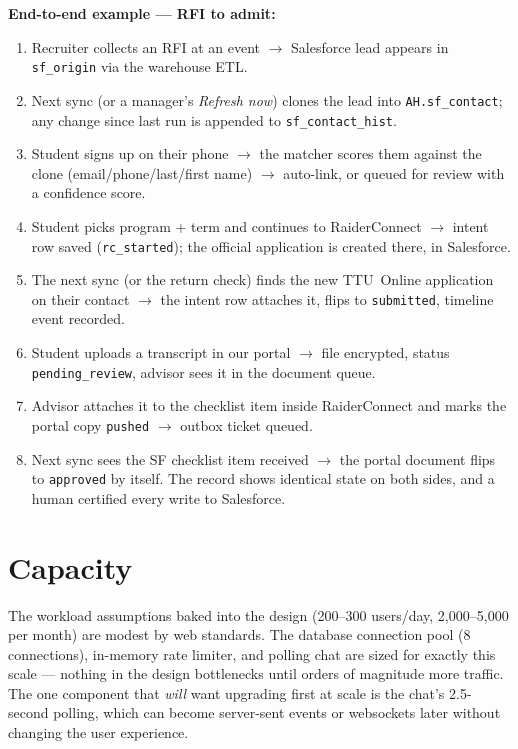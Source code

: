 \documentclass[11pt,letterpaper]{report}
\begin{document}
\begin{plainbox}
\textbf{End-to-end example --- RFI to admit:}
\begin{enumerate}[leftmargin=1.4em,itemsep=2pt]
  \item Recruiter collects an RFI at an event $\rightarrow$ Salesforce lead
        appears in \texttt{sf\_origin} via the warehouse ETL.
  \item Next sync (or a manager's \emph{Refresh now}) clones the lead into
        \texttt{AH.sf\_contact}; any change since last run is appended to
        \texttt{sf\_contact\_hist}.
  \item Student signs up on their phone $\rightarrow$ the matcher scores them
        against the clone (email/phone/last/first name) $\rightarrow$ auto-link,
        or queued for review with a confidence score.
  \item Student picks program + term and continues to RaiderConnect
        $\rightarrow$ intent row saved (\texttt{rc\_started}); the official
        application is created there, in Salesforce.
  \item The next sync (or the return check) finds the new TTU~Online
        application on their contact $\rightarrow$ the intent row attaches it,
        flips to \texttt{submitted}, timeline event recorded.
  \item Student uploads a transcript in our portal $\rightarrow$ file encrypted,
        status \texttt{pending\_review}, advisor sees it in the document queue.
  \item Advisor attaches it to the checklist item inside RaiderConnect and marks
        the portal copy \texttt{pushed} $\rightarrow$ outbox ticket queued.
  \item Next sync sees the SF checklist item received $\rightarrow$ the portal
        document flips to \texttt{approved} by itself. The record shows
        identical state on both sides, and a human certified every write to
        Salesforce.
\end{enumerate}
\end{plainbox}

\section{Capacity}

The workload assumptions baked into the design (200--300 users/day, 2,000--5,000
per month) are modest by web standards. The database connection pool (8
connections), in-memory rate limiter, and polling chat are sized for exactly
this scale --- nothing in the design bottlenecks until orders of magnitude more
traffic. The one component that \emph{will} want upgrading first at scale is the
chat's 2.5-second polling, which can become server-sent events or websockets
later without changing the user experience.
\end{document}
